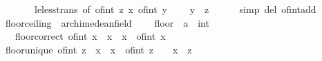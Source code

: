 \begin{isabellebody}
\ \ \ \ \ \ \ le{\isacharunderscore}{\kern0pt}less{\isacharunderscore}{\kern0pt}trans\ {\isacharbrackleft}{\kern0pt}of\ {\isachardoublequoteopen}of{\isacharunderscore}{\kern0pt}int\ z{\isachardoublequoteclose}\ {\isachardoublequoteopen}x{\isachardoublequoteclose}\ {\isachardoublequoteopen}of{\isacharunderscore}{\kern0pt}int\ {\isacharparenleft}{\kern0pt}y\ {\isacharplus}{\kern0pt}\ {}{\isacharparenright}{\kern0pt}{\isachardoublequoteclose}{\isacharbrackright}{\kern0pt}\ \isamarkupfalse%
\ {\isachardoublequoteopen}y\ {\isacharequal}{\kern0pt}\ z{\isachardoublequoteclose}\isanewline
\ \ \ \ \isamarkupfalse%
\ {\isacharparenleft}{\kern0pt}simp\ del{\isacharcolon}{\kern0pt}\ of{\isacharunderscore}{\kern0pt}int{\isacharunderscore}{\kern0pt}add{\isacharparenright}{\kern0pt}\isanewline
{}\isamarkupfalse%
%
\endisatagproof
{\isafoldproof}%
%
\isadelimproof
%
\endisadelimproof
%
\isadelimdocument
%
\endisadelimdocument
%
\isatagdocument
%
\isamarkuptrue%
%
\endisatagdocument
{\isafolddocument}%
%
\isadelimdocument
%
\endisadelimdocument
{}\isamarkupfalse%
\ floor{\isacharunderscore}{\kern0pt}ceiling\ {\isacharequal}{\kern0pt}\ archimedean{\isacharunderscore}{\kern0pt}field\ {\isacharplus}{\kern0pt}\isanewline
\ \ \ floor\ {\isacharcolon}{\kern0pt}{\isacharcolon}{\kern0pt}\ {\isachardoublequoteopen}{\isacharprime}{\kern0pt}a\ {\isasymRightarrow}\ int{\isachardoublequoteclose}\ \ {\isacharparenleft}{\kern0pt}{\isachardoublequoteopen}{\isasymlfloor}{\isacharunderscore}{\kern0pt}{\isasymrfloor}{\isachardoublequoteclose}{\isacharparenright}{\kern0pt}\isanewline
\ \ \ floor{\isacharunderscore}{\kern0pt}correct{\isacharcolon}{\kern0pt}\ {\isachardoublequoteopen}of{\isacharunderscore}{\kern0pt}int\ {\isasymlfloor}x{\isasymrfloor}\ {\isasymle}\ x\ {\isasymand}\ x\ {\isacharless}{\kern0pt}\ of{\isacharunderscore}{\kern0pt}int\ {\isacharparenleft}{\kern0pt}{\isasymlfloor}x{\isasymrfloor}\ {\isacharplus}{\kern0pt}\ {}{\isacharparenright}{\kern0pt}{\isachardoublequoteclose}\isanewline
\isanewline
{}\isamarkupfalse%
\ floor{\isacharunderscore}{\kern0pt}unique{\isacharcolon}{\kern0pt}\ {\isachardoublequoteopen}of{\isacharunderscore}{\kern0pt}int\ z\ {\isasymle}\ x\ {\isasymLongrightarrow}\ x\ {\isacharless}{\kern0pt}\ of{\isacharunderscore}{\kern0pt}int\ z\ {\isacharplus}{\kern0pt}\ {}\ {\isasymLongrightarrow}\ {\isasymlfloor}x{\isasymrfloor}\ {\isacharequal}{\kern0pt}\ z{\isachardoublequoteclose}\isanewline

\end{isabellebody}
